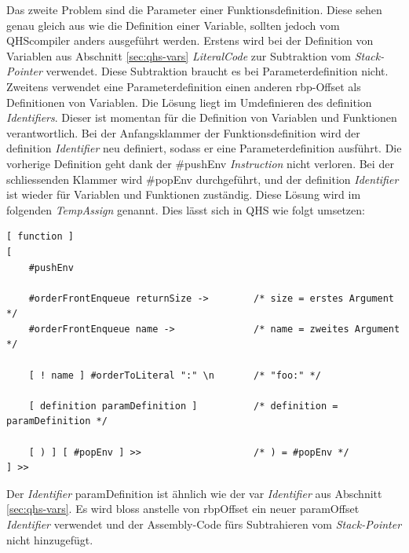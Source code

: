 Das zweite Problem sind die Parameter einer Funktionsdefinition. Diese sehen genau gleich aus wie die Definition einer Variable, sollten jedoch vom QHScompiler anders ausgeführt werden.
Erstens wird bei der Definition von Variablen aus Abschnitt \ref{sec:qhs-vars} \textit{LiteralCode} zur Subtraktion vom \textit{Stack-Pointer} verwendet. Diese Subtraktion braucht es bei Parameterdefinition nicht.
Zweitens verwendet eine Parameterdefinition einen anderen rbp-Offset als Definitionen von Variablen.
Die Lösung liegt im Umdefinieren des {\selectListingFont definition} \textit{Identifiers}. Dieser ist momentan für die Definition von Variablen und Funktionen verantwortlich.
Bei der Anfangsklammer der Funktionsdefinition wird der {\selectListingFont definition} \textit{Identifier} neu definiert, sodass er eine Parameterdefinition ausführt.
Die vorherige Definition geht dank der {\listingFont\selectfont \#pushEnv} \textit{Instruction} nicht verloren.
Bei der schliessenden Klammer wird {\listingFont\selectfont \#popEnv} durchgeführt, und der {\selectListingFont definition} \textit{Identifier} ist wieder für Variablen und Funktionen zuständig.
Diese Lösung wird im folgenden \textit{TempAssign} genannt.
Dies lässt sich in QHS wie folgt umsetzen:

\begin{minipage}{\linewidth}
\begin{lstlisting}[language=QHS, caption=Implementation eines \textit{TempAssigns} für Parameter Definitionen]
[ function ]
[
    #pushEnv

    #orderFrontEnqueue returnSize ->        /* size = erstes Argument */
    #orderFrontEnqueue name ->              /* name = zweites Argument */

    [ ! name ] #orderToLiteral ":" \n       /* "foo:" */

    [ definition paramDefinition ]          /* definition = paramDefinition */
    
    [ ) ] [ #popEnv ] >>                    /* ) = #popEnv */
] >>
\end{lstlisting}
\end{minipage}

Der \textit{Identifier} {\selectListingFont paramDefinition} ist ähnlich wie der {\selectListingFont var} \textit{Identifier} aus Abschnitt \ref{sec:qhs-vars}.
Es wird bloss anstelle von {\selectListingFont rbpOffset} ein neuer {\selectListingFont paramOffset} \textit{Identifier} verwendet und der Assembly-Code fürs Subtrahieren vom \textit{Stack-Pointer} nicht hinzugefügt.

